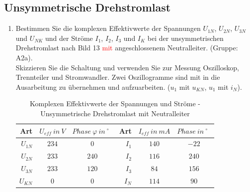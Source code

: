  	\subsection{Unsymmetrische Drehstromlast}
	 	\begin{enumerate}[label=\alph*)]
	 		\item Bestimmen Sie die komplexen Effektivwerte der Spannungen $U_{1N}$, $U_{2N}$, $U_{3N}$ und $U_{NK}$ und der Ströme $I_{1}$, $I_{2}$, $I_{3}$ und $I_{K}$ bei der unsymmetrischen Drehstromlast nach Bild 13 \textcolor{red}{mit} angeschlossenem Neutralleiter. (Gruppe: A2a).\\
			Skizzieren Sie die Schaltung und verwenden Sie zur Messung Oszilloskop, Trennteiler und Stromwandler. Zwei Oszillogramme sind mit in die Ausarbeitung zu übernehmen und aufzuarbeiten. ($u_{1}$ mit $u_{KN}$, $u_{1}$ mit $i_{N}$).
	 		\begin{center}
	 			\begin{table}[h!]
	 				\begin{tabular}{r c c r c c}
	 					\hline
	 					Art & \( U_{eff}\ in\ V \) & \( Phase\ \varphi\ in\ ^\circ\ \ \)  & Art & \( I_{eff}\ in\ mA \) & \( Phase\ in\ ^\circ\ \ \) \\
	 					\hline
	 					$U_{1N}$ & \( 234 \) & \( 0   \) &
	 					$I_{1}$	 & \( 140 \) & \( -22 \) \\
	 					$U_{2N}$ & \( 233 \) & \( 240 \) &
	 					$I_{2}$	 & \( 116 \) & \( 240 \) \\
	 					$U_{3N}$ & \( 233 \) & \( 120 \) &
	 					$I_{3}$	 & \( 84  \) & \( 156 \) \\
	 					$U_{KN}$ & \( 0   \) & \( 0   \) &
	 					$I_{N}$	 & \( 114 \) & \( 90  \) \\
	 					\hline
	 				\end{tabular}
	 				\caption{Komplexen Effektivwerte der Spannungen und Ströme - Unsymmetrische Drehstromlast mit Neutralleiter}
	 			\end{table}
	 		\end{center}
	 		

\end{enumerate}
